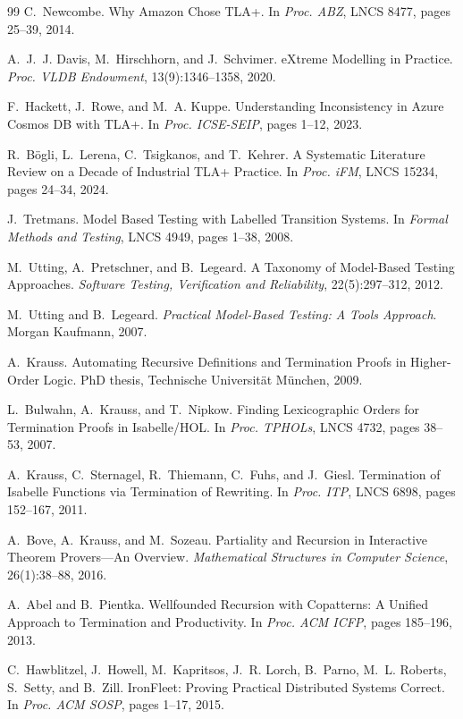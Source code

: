 \documentclass[11pt,a4paper]{article}
\begin{document}
\begin{thebibliography}{99}
C.~Newcombe.
Why Amazon Chose TLA+.
In \emph{Proc. ABZ}, LNCS 8477, pages 25--39, 2014.

A.~J.~J. Davis, M.~Hirschhorn, and J.~Schvimer.
eXtreme Modelling in Practice.
\emph{Proc. VLDB Endowment}, 13(9):1346--1358, 2020.

F.~Hackett, J.~Rowe, and M.~A. Kuppe.
Understanding Inconsistency in Azure Cosmos DB with TLA+.
In \emph{Proc. ICSE-SEIP}, pages 1--12, 2023.

R.~B\"ogli, L.~Lerena, C.~Tsigkanos, and T.~Kehrer.
A Systematic Literature Review on a Decade of Industrial TLA+ Practice.
In \emph{Proc. iFM}, LNCS 15234, pages 24--34, 2024.

J.~Tretmans.
Model Based Testing with Labelled Transition Systems.
In \emph{Formal Methods and Testing}, LNCS 4949, pages 1--38, 2008.

M.~Utting, A.~Pretschner, and B.~Legeard.
A Taxonomy of Model-Based Testing Approaches.
\emph{Software Testing, Verification and Reliability}, 22(5):297--312, 2012.

M.~Utting and B.~Legeard.
\emph{Practical Model-Based Testing: A Tools Approach}.
Morgan Kaufmann, 2007.

A.~Krauss.
Automating Recursive Definitions and Termination Proofs in Higher-Order
Logic.
PhD thesis, Technische Universit\"at M\"unchen, 2009.

L.~Bulwahn, A.~Krauss, and T.~Nipkow.
Finding Lexicographic Orders for Termination Proofs in Isabelle/HOL.
In \emph{Proc. TPHOLs}, LNCS 4732, pages 38--53, 2007.

A.~Krauss, C.~Sternagel, R.~Thiemann, C.~Fuhs, and J.~Giesl.
Termination of Isabelle Functions via Termination of Rewriting.
In \emph{Proc. ITP}, LNCS 6898, pages 152--167, 2011.

A.~Bove, A.~Krauss, and M.~Sozeau.
Partiality and Recursion in Interactive Theorem Provers---An Overview.
\emph{Mathematical Structures in Computer Science}, 26(1):38--88, 2016.

A.~Abel and B.~Pientka.
Wellfounded Recursion with Copatterns: A Unified Approach to Termination
and Productivity.
In \emph{Proc. ACM ICFP}, pages 185--196, 2013.

C.~Hawblitzel, J.~Howell, M.~Kapritsos, J.~R. Lorch, B.~Parno,
M.~L. Roberts, S.~Setty, and B.~Zill.
IronFleet: Proving Practical Distributed Systems Correct.
In \emph{Proc. ACM SOSP}, pages 1--17, 2015.


\end{thebibliography}
\end{document}
